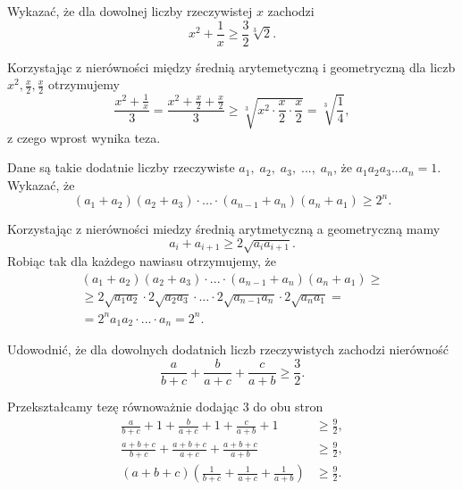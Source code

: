 \newpage
{}

\begin{problem}{1} 
	Wykazać, że dla dowolnej liczby rzeczywistej $x$ zachodzi
	\[
		x^2 + \frac{1}{x} \geqslant \frac{3}{2}\sqrt[3]{2}.
	\]
\end{problem}

\vspace{5px}

\noindent
Korzystając z nierówności między średnią arytemetyczną i geometryczną dla liczb $x^2, \frac{x}{2}, \frac{x}{2}$ otrzymujemy
\[
	\frac{x^2 + \frac{1}{x}}{3} = \frac{x^2 + \frac{x}{2} + \frac{x}{2}}{3} \geqslant \sqrt[3]{x^2 \cdot \frac{x}{2} \cdot \frac{x}{2}} = \sqrt[3]{\frac{1}{4}},
\]
z czego wprost wynika teza.

\vspace{5px}

\begin{problem}{2} 
	Dane są takie dodatnie liczby rzeczywiste $a_1, \;a_2,\; a_3,\; ...,\; a_n$, że $a_1a_2a_3...a_n = 1$. Wykazać, że
	\[
		(a_1 + a_2)(a_2 + a_3)\cdot ... \cdot (a_{n-1} + a_n)(a_n + a_1) \geqslant 2^n.
	\]
\end{problem}

\vspace{5px}

\noindent
Korzystając z nierówności miedzy średnią arytmetyczną a geometryczną mamy
\[
	a_i + a_{i + 1} \geqslant 2\sqrt{a_ia_{i + 1}}.
\]
Robiąc tak dla każdego nawiasu otrzymujemy, że
\begin{multline*}
	(a_1 + a_2)(a_2 + a_3)\cdot ... \cdot (a_{n-1} + a_n)(a_n + a_1) \geqslant \\
	\geqslant 2\sqrt{a_1a_{2}} \cdot 2\sqrt{a_2a_{3}} \cdot ... \cdot 2\sqrt{a_{n-1}a_{n}}\cdot 2\sqrt{a_na_{1}}  = \\
	= 2^n a_1a_2\cdot ... \cdot a_n = 2^n.
\end{multline*}

\begin{problem}{3} 
	Udowodnić, że dla dowolnych dodatnich liczb rzeczywistych zachodzi nierówność
	\[
		\frac{a}{b + c} + \frac{b}{a + c} + \frac{c}{a + b} \geqslant \frac{3}{2}.
	\]
\end{problem}

\vspace{5px}

\noindent
Przekształcamy tezę równoważnie dodając $3$ do obu stron
\begin{align*}
	\frac{a}{b + c} + 1 + \frac{b}{a + c} + 1 + \frac{c}{a + b} + 1 &\geqslant \frac{9}{2}, \\
	\frac{a + b + c}{b + c} + \frac{a + b + c}{a + c} + \frac{a + b + c}{a + b} &\geqslant \frac{9}{2}, \\
	\left(a + b + c\right)\left(\frac{1}{b + c} + \frac{1}{a + c} + \frac{1}{a + b}\right) &\geqslant \frac{9}{2}.
\end{align*}

